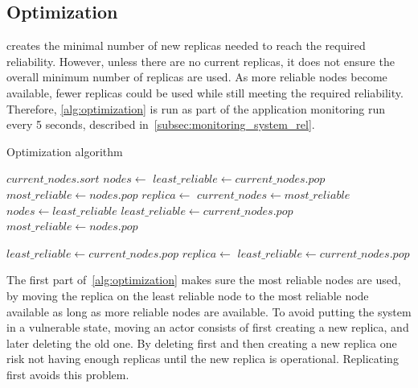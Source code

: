\documentclass{cslthse-msc}
\begin{document}
\subsection{Optimization} \label{subsec:design_optimization}
 creates the minimal number of new replicas needed to reach the required reliability. However, unless there are no current replicas, it does not ensure the overall minimum number of replicas are used. As more reliable nodes become available, fewer replicas could be used while still meeting the required reliability. Therefore, \cref{alg:optimization} is run as part of the application monitoring run every 5 seconds, described in~\cref{subsec:monitoring_system_rel}.

\begin{algorithm} 
	\caption{Optimization algorithm} \label{alg:optimization}
	\begin{algorithmic}[1]
	\Statex
	\State $current\_nodes.sort$
	\State $nodes\gets $ 
	\State $least\_reliable\gets current\_nodes.pop$
	\State $most\_reliable\gets nodes.pop$
			\State $replica\gets $
			\State
			\State
			\State
			\State $current\_nodes\gets most\_reliable$
			\State $nodes\gets least\_reliable$
			\State $least\_reliable\gets current\_nodes.pop$
			\State $most\_reliable\gets nodes.pop$
	\EndWhile
	\EndProcedure
	\State
	
	\State $least\_reliable\gets current\_nodes.pop$
		\State $replica\gets $
		\State
		\State $least\_reliable\gets current\_nodes.pop$
	\EndWhile
	\EndProcedure
	\end{algorithmic}
\end{algorithm}

The first part of~\cref{alg:optimization} makes sure the most reliable nodes are used, by moving the replica on the least reliable node to the most reliable node available as long as more reliable nodes are available. To avoid putting the system in a vulnerable state, moving an actor consists of first creating a new replica, and later deleting the old one. By deleting first and then creating a new replica one risk not having enough replicas until the new replica is operational. Replicating first avoids this problem.
\end{document}
